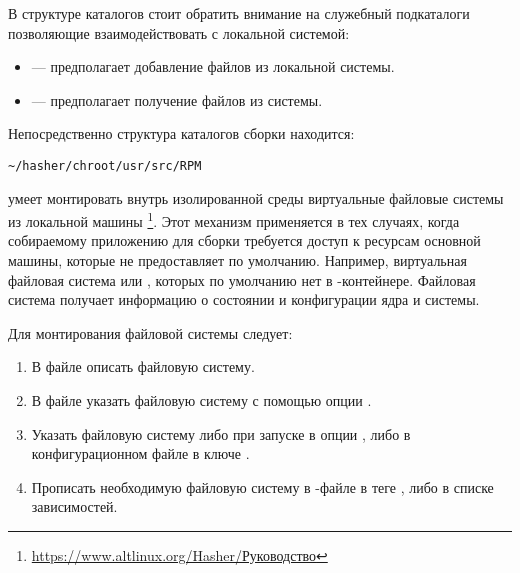В структуре каталогов  стоит обратить внимание на служебный подкаталоги
позволяющие взаимодействовать с локальной системой:
\begin{itemize}
	\item {} --- предполагает добавление файлов из локальной системы.
	\item {} --- предполагает получение файлов из  системы.
\end{itemize}

Непосредственно структура каталогов  сборки находится:
\begin{verbatim}
~/hasher/chroot/usr/src/RPM
\end{verbatim}

 умеет монтировать внутрь изолированной среды виртуальные файловые системы
из локальной машины%
\footnote{\href{https://www.altlinux.org/Hasher/\%D0\%A0\%D1\%83\%D0\%BA\%D0\%BE\%D0\%B2\%D0\%BE\%D0\%B4\%D1\%81\%D1\%82\%D0\%B2\%D0\%BE\#\%D0\%9C\%D0\%BE\%D0\%BD\%D1\%82\%D0\%B8\%D1\%80\%D0\%BE\%D0\%B2\%D0\%B0\%D0\%BD\%D0\%B8\%D0\%B5_\%D1\%84\%D0\%B0\%D0\%B9\%D0\%BB\%D0\%BE\%D0\%B2\%D1\%8B\%D1\%85_\%D1\%81\%D0\%B8\%D1\%81\%D1\%82\%D0\%B5\%D0\%BC_\%D0\%B2\%D0\%BD\%D1\%83\%D1\%82\%D1\%80\%D0\%B8_hasher}{https://www.altlinux.org/Hasher/Руководство}}.
Этот механизм применяется в тех случаях, когда собираемому приложению для сборки требуется доступ к ресурсам
основной машины, которые  не предоставляет по умолчанию. Например, виртуальная файловая система
 или , которых по умолчанию нет в -контейнере. Файловая система 
получает информацию о состоянии и конфигурации ядра и системы.

Для монтирования файловой системы следует:
\begin{enumerate}
    \item В файле  описать файловую систему.
    \item В файле  указать файловую систему с помощью опции .
    \item Указать файловую систему либо при запуске  в опции , либо в
        конфигурационном файле  в ключе .
    \item Прописать необходимую файловую систему в -файле в теге , либо в списке зависимостей.
\end{enumerate}


